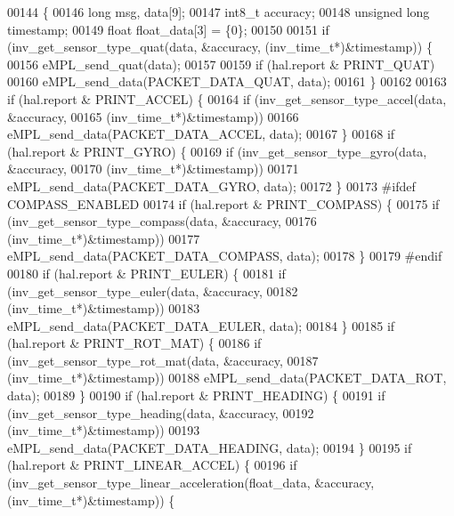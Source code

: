 \begin{DoxyCode}
00144 \{
00146     \textcolor{keywordtype}{long} msg, data[9];
00147     int8\_t accuracy;
00148     \textcolor{keywordtype}{unsigned} \textcolor{keywordtype}{long} timestamp;
00149     \textcolor{keywordtype}{float} float\_data[3] = \{0\};
00150 
00151     \textcolor{keywordflow}{if} (inv\_get\_sensor\_type\_quat(data, &accuracy, (inv\_time\_t*)&timestamp)) \{
00156         eMPL\_send\_quat(data);
00157 
00159         \textcolor{keywordflow}{if} (hal.report & PRINT_QUAT)
00160             eMPL\_send\_data(PACKET\_DATA\_QUAT, data);
00161     \}
00162 
00163     \textcolor{keywordflow}{if} (hal.report & PRINT_ACCEL) \{
00164         \textcolor{keywordflow}{if} (inv\_get\_sensor\_type\_accel(data, &accuracy,
00165             (inv\_time\_t*)&timestamp))
00166             eMPL\_send\_data(PACKET\_DATA\_ACCEL, data);
00167     \}
00168     \textcolor{keywordflow}{if} (hal.report & PRINT_GYRO) \{
00169         \textcolor{keywordflow}{if} (inv\_get\_sensor\_type\_gyro(data, &accuracy,
00170             (inv\_time\_t*)&timestamp))
00171             eMPL\_send\_data(PACKET\_DATA\_GYRO, data);
00172     \}
00173 \textcolor{preprocessor}{#ifdef COMPASS\_ENABLED}
00174     \textcolor{keywordflow}{if} (hal.report & PRINT_COMPASS) \{
00175         \textcolor{keywordflow}{if} (inv\_get\_sensor\_type\_compass(data, &accuracy,
00176             (inv\_time\_t*)&timestamp))
00177             eMPL\_send\_data(PACKET\_DATA\_COMPASS, data);
00178     \}
00179 \textcolor{preprocessor}{#endif}
00180     \textcolor{keywordflow}{if} (hal.report & PRINT_EULER) \{
00181         \textcolor{keywordflow}{if} (inv\_get\_sensor\_type\_euler(data, &accuracy,
00182             (inv\_time\_t*)&timestamp))
00183             eMPL\_send\_data(PACKET\_DATA\_EULER, data);
00184     \}
00185     \textcolor{keywordflow}{if} (hal.report & PRINT_ROT_MAT) \{
00186         \textcolor{keywordflow}{if} (inv\_get\_sensor\_type\_rot\_mat(data, &accuracy,
00187             (inv\_time\_t*)&timestamp))
00188             eMPL\_send\_data(PACKET\_DATA\_ROT, data);
00189     \}
00190     \textcolor{keywordflow}{if} (hal.report & PRINT_HEADING) \{
00191         \textcolor{keywordflow}{if} (inv\_get\_sensor\_type\_heading(data, &accuracy,
00192             (inv\_time\_t*)&timestamp))
00193             eMPL\_send\_data(PACKET\_DATA\_HEADING, data);
00194     \}
00195     \textcolor{keywordflow}{if} (hal.report & PRINT_LINEAR_ACCEL) \{
00196         \textcolor{keywordflow}{if} (inv\_get\_sensor\_type\_linear\_acceleration(float\_data, &accuracy, (inv\_time\_t*)&timestamp)) \{

\end{DoxyCode}
